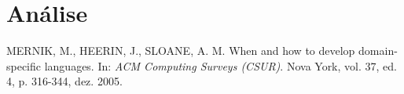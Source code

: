 \documentclass[a4paper, 10pt, conference]{ieeeconf}
\begin{document}
\section{Análise}




\begin{thebibliography}{99}

 MERNIK, M., HEERIN, J., SLOANE, A. M. When and how to develop domain-specific languages. In: \textit{ACM Computing Surveys (CSUR)}. Nova York, vol. 37, ed. 4, p. 316-344, dez. 2005.

\end{thebibliography}
\end{document}
